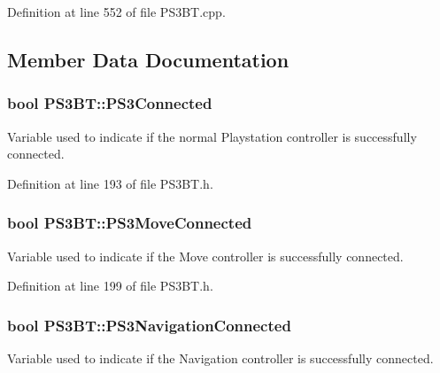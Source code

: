 \-Definition at line 552 of file \-P\-S3\-B\-T.\-cpp.



\subsection{\-Member \-Data \-Documentation}
\hypertarget{class_p_s3_b_t_a2804535e3164eafca80a6f6c6bd9a4f9}{
\subsubsection[{\-P\-S3\-Connected}]{\setlength{\rightskip}{0pt plus 5cm}bool {\bf \-P\-S3\-B\-T\-::\-P\-S3\-Connected}}}\label{class_p_s3_b_t_a2804535e3164eafca80a6f6c6bd9a4f9}
\-Variable used to indicate if the normal \-Playstation controller is successfully connected. 

\-Definition at line 193 of file \-P\-S3\-B\-T.\-h.

\hypertarget{class_p_s3_b_t_a9273b6796948b83772117b3805421b4a}{
\subsubsection[{\-P\-S3\-Move\-Connected}]{\setlength{\rightskip}{0pt plus 5cm}bool {\bf \-P\-S3\-B\-T\-::\-P\-S3\-Move\-Connected}}}\label{class_p_s3_b_t_a9273b6796948b83772117b3805421b4a}
\-Variable used to indicate if the \-Move controller is successfully connected. 

\-Definition at line 199 of file \-P\-S3\-B\-T.\-h.

\hypertarget{class_p_s3_b_t_ab35277632083d43f8750d130bea6d430}{
\subsubsection[{\-P\-S3\-Navigation\-Connected}]{\setlength{\rightskip}{0pt plus 5cm}bool {\bf \-P\-S3\-B\-T\-::\-P\-S3\-Navigation\-Connected}}}\label{class_p_s3_b_t_ab35277632083d43f8750d130bea6d430}
\-Variable used to indicate if the \-Navigation controller is successfully connected. 

